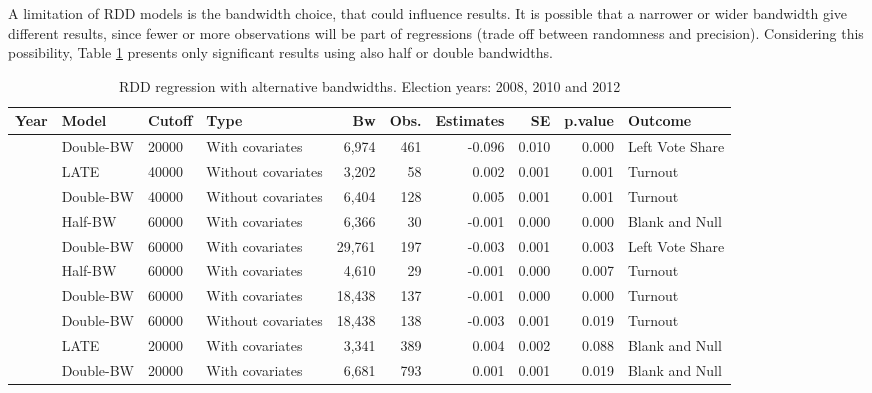 \documentclass[
  12pt,
]{article}
\begin{document}
A limitation of RDD models is the bandwidth choice, that could influence
results. It is possible that a narrower or wider bandwidth give
different results, since fewer or more observations will be part of
regressions (trade off between randomness and precision). Considering
this possibility, Table \ref{tab:r.sig} presents only significant
results using also half or double bandwidths.

\begin{landscape}\begin{table}[!h]

\caption{\label{tab:r.sig}RDD regression with alternative bandwidths. Election years: 2008, 2010 and 2012}
\centering
\fontsize{9}{11}\selectfont
\begin{tabular}[t]{llllrrrrrl}
\toprule
Year & Model & Cutoff & Type & Bw & Obs. & Estimates & SE & p.value & Outcome\\
\midrule
 & Double-BW & 20000 & With covariates & 6,974 & 461 & -0.096 & 0.010 & 0.000 & Left Vote Share\\

 & LATE & 40000 & Without covariates & 3,202 & 58 & 0.002 & 0.001 & 0.001 & Turnout\\

 & Double-BW & 40000 & Without covariates & 6,404 & 128 & 0.005 & 0.001 & 0.001 & Turnout\\

 & Half-BW & 60000 & With covariates & 6,366 & 30 & -0.001 & 0.000 & 0.000 & Blank and Null\\

 & Double-BW & 60000 & With covariates & 29,761 & 197 & -0.003 & 0.001 & 0.003 & Left Vote Share\\

 & Half-BW & 60000 & With covariates & 4,610 & 29 & -0.001 & 0.000 & 0.007 & Turnout\\

 & Double-BW & 60000 & With covariates & 18,438 & 137 & -0.001 & 0.000 & 0.000 & Turnout\\

\multirow{-8}{*}{\raggedright\arraybackslash 2008} & Double-BW & 60000 & Without covariates & 18,438 & 138 & -0.003 & 0.001 & 0.019 & Turnout\\
\cmidrule{1-10}
 & LATE & 20000 & With covariates & 3,341 & 389 & 0.004 & 0.002 & 0.088 & Blank and Null\\

 & Double-BW & 20000 & With covariates & 6,681 & 793 & 0.001 & 0.001 & 0.019 & Blank and Null\\


\end{tabular}
\end{table}
\end{landscape}
\end{document}

